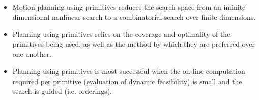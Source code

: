 \begin{itemize}
	\item Motion planning using primitives reduces the search space from an infinite dimensional nonlinear search to a combinatorial search over finite dimensions.
	\item Planning using primitives relies on the coverage and optimality of the primitives being used, as well as the method by which they are preferred over one another.
	\item Planning using primitives is most successful when the on-line computation required per primitive (evaluation of dynamic feasibility) is small and the search is guided (i.e. orderings).
\end{itemize}